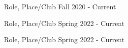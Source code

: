  






Role, Place/Club      \hfill Fall 2020 - Current

Role, Place/Club      \hfill Spring 2022 - Current

Role, Place/Club      \hfill Spring 2022 - Current



